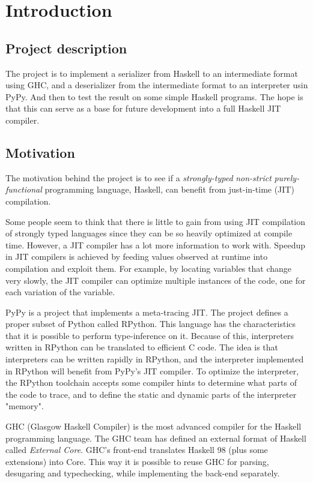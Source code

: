 
\section{Introduction}

\subsection{Project description}

The project is to implement a serializer from Haskell to an intermediate
format using GHC, and a deserializer from the intermediate format to an
interpreter usin PyPy. And then to test the result on some simple Haskell
programs. The hope is that this can serve as a base for future development
into a full Haskell JIT compiler.

\subsection{Motivation}

The motivation behind the project is to see if a \emph{strongly-typed} 
\emph{non-strict} \emph{purely-functional} programming language, Haskell, 
can benefit from just-in-time (JIT) compilation.

Some people seem to think that there is little to gain from using 
JIT compilation of strongly typed languages since they can be
so heavily optimized at compile time. However, a JIT compiler has a lot
more information to work with. Speedup in JIT compilers is achieved by
feeding values observed at runtime into compilation and exploit them.
For example, by locating variables that change very slowly, the JIT compiler can
optimize multiple instances of the code, one for each variation of the
variable. \cite{bolz2011runtime}

PyPy is a project that implements a meta-tracing JIT. The project
defines a proper subset of Python called RPython. This language has 
the characteristics that it is possible to perform type-inference on it.
Because of this, interpreters written in RPython can be translated to
efficient C code.
The idea is that interpreters can be written rapidly in RPython, and the
interpreter implemented in RPython will benefit from PyPy's JIT compiler.
To optimize the interpreter, the RPython toolchain accepts some compiler
hints to determine what parts of the code to trace, and to define the 
static and dynamic parts of the interpreter "memory". \cite{bolz2011runtime}

GHC (Glasgow Haskell Compiler) is the most advanced compiler for the
Haskell programming language. The GHC team has defined an external format
of Haskell called \emph{External Core}. GHC's front-end translates
Haskell 98 (plus some extensions) into Core. This way it is possible to
reuse GHC for parsing, desugaring and typechecking, while implementing
the back-end separately. \cite{tolmach2010ghc}

